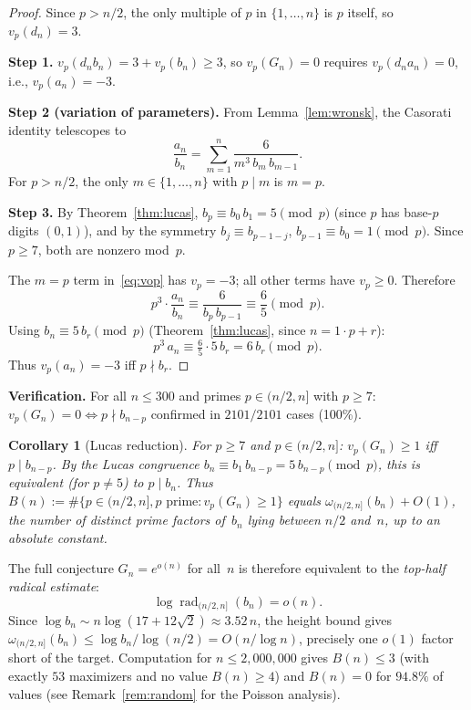 \documentclass[11pt]{article}
\newtheorem{corollary}[theorem]{Corollary}
\theoremstyle{definition}
\theoremstyle{remark}
\begin{document}
\begin{proof}
Since $p > n/2$, the only multiple of $p$ in $\{1,\ldots,n\}$
is $p$ itself, so $v_p(d_n) = 3$.

\textbf{Step 1.}
$v_p(d_n b_n) = 3 + v_p(b_n) \ge 3$,
so $v_p(G_n) = 0$ requires $v_p(d_n a_n) = 0$,
i.e., $v_p(a_n) = -3$.

\textbf{Step 2 (variation of parameters).}
From Lemma~\ref{lem:wronsk}, the Casorati
identity telescopes to
\begin{equation}\label{eq:vop}
\frac{a_n}{b_n} = \sum_{m=1}^n \frac{6}{m^3\,b_m\,b_{m-1}}.
\end{equation}
For $p > n/2$, the only $m \in \{1,\ldots,n\}$ with
$p \mid m$ is $m = p$.

\textbf{Step 3.}
By Theorem~\ref{thm:lucas},
$b_p \equiv b_0\,b_1 = 5 \pmod{p}$
(since $p$ has base-$p$ digits $(0,1)$),
and by the symmetry $b_j \equiv b_{p-1-j}$,
$b_{p-1} \equiv b_0 = 1 \pmod{p}$.
Since $p \ge 7$, both are nonzero mod~$p$.

The $m = p$ term in~\eqref{eq:vop} has $v_p = -3$;
all other terms have $v_p \ge 0$. Therefore
\[
p^3 \cdot \frac{a_n}{b_n} \equiv \frac{6}{b_p\,b_{p-1}}
\equiv \frac{6}{5} \pmod{p}.
\]
Using $b_n \equiv 5\,b_r \pmod{p}$
(Theorem~\ref{thm:lucas}, since $n = 1 \cdot p + r$):
\[
p^3\,a_n \equiv \tfrac{6}{5} \cdot 5\,b_r = 6\,b_r \pmod{p}.
\]
Thus $v_p(a_n) = -3$ iff $p \nmid b_r$.
\end{proof}

\textbf{Verification.}
For all $n \le 300$ and primes $p \in (n/2, n]$ with $p \ge 7$:
$v_p(G_n) = 0 \iff p \nmid b_{n-p}$ confirmed in
$2101/2101$ cases (100\%).

\begin{corollary}[Lucas reduction]\label{cor:lucas}
For $p \ge 7$ and $p \in (n/2, n]$: $v_p(G_n) \ge 1$ iff $p \mid b_{n-p}$.
By the Lucas congruence $b_n \equiv b_1\,b_{n-p} = 5\,b_{n-p} \pmod{p}$,
this is equivalent (for $p \ne 5$) to $p \mid b_n$.
Thus $B(n) := \#\{p \in (n/2, n], p \text{ prime} : v_p(G_n) \ge 1\}$
equals $\omega_{(n/2,n]}(b_n) + O(1)$, the number of
\emph{distinct prime factors of~$b_n$ lying between
$n/2$ and~$n$}, up to an absolute constant.
\end{corollary}

The full conjecture $G_n = e^{o(n)}$ for all~$n$
is therefore equivalent to the
\emph{top-half radical estimate}:
\begin{equation}\label{eq:rad}
\log\operatorname{rad}_{(n/2,n]}(b_n) = o(n).
\end{equation}
Since $\log b_n \sim n\log(17+12\sqrt{2}) \approx 3.52\,n$,
the height bound gives
$\omega_{(n/2,n]}(b_n) \le \log b_n / \log(n/2)
= O(n/\log n)$, precisely one $o(1)$ factor
short of the target.
Computation for $n \le 2{,}000{,}000$ gives $B(n) \le 3$
(with exactly $53$ maximizers and no value $B(n) \ge 4$)
and $B(n) = 0$ for $94.8\%$ of values
(see Remark~\ref{rem:random} for the Poisson analysis).
\end{document}
